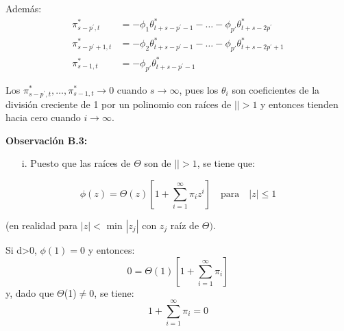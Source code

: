 Adem\'{a}s:
\begin{align*}
\pi_{s-p^{'},t}^{\ast} &= -\phi_{1}\theta_{t+s-p^{'}-1}^{\ast} -\ldots -\phi_{p'} \theta_{t+s-2p^{'}}^{\ast}\\
\pi_{s-p^{'}+1,t}^{\ast} &= -\phi_{2}\theta_{t+s-p^{'}-1}^{\ast } -\ldots -\phi_{p'} \theta_{t+s-2p^{'}+1}^{\ast}\\
\pi_{s-1,t}^{\ast } &= -\phi_{p'}\theta_{t+s-p^{'}-1}^{\ast } 
\end{align*}

Los $\pi_{s-p^{'},t}^{\ast },\ldots,\pi_{s-1,t}^{\ast} \to 0$ cuando $s\to \infty$, pues los $\theta_{i}$ son coeficientes de la divisi\'{o}n creciente de 1 por un polinomio con ra\'{i}ces de $\left| \right|>1$ y entonces tienden hacia cero cuando $i\to \infty$.\newline

\textbf{Observaci\'{o}n B.3:}\newline

\begin{enumerate}
\item[i.] Puesto que las ra\'{i}ces de $\Theta$ son de $\left| \right|>1$, se tiene que:
\end{enumerate}
\[
\phi(z)=\Theta(z)\left[1+\sum_{i=1}^\infty \pi_{i} z^{i} \right]\quad \text{para}\quad |z|\leq 1
\]

(en realidad para $\left| z \right|<$ min $\left|z_{j}\right|$ con $z_{j}$ ra\'{i}z de $\Theta )$.

Si d\textgreater 0, $\phi \left( 1 \right)=0$ y entonces:
\[
0=\Theta (1)\left[ {1+\sum_{i=1}^\infty {\pi_{i} } } \right]
\]
y, dado que $\Theta $(1)$\ne 0$, se tiene:
\[
1+\sum_{i=1}^\infty {\pi_{i} =0} 
\]


